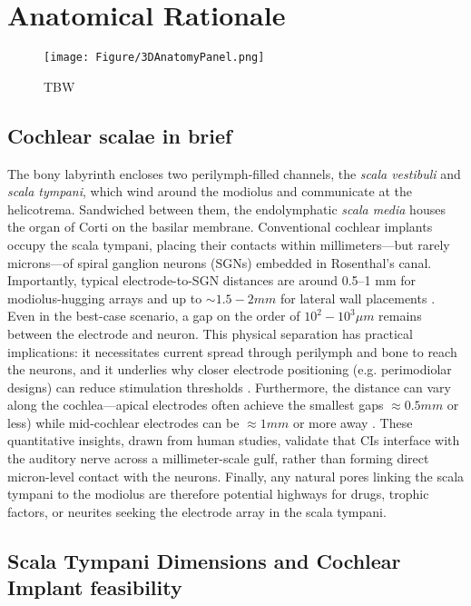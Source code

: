 
\section{\label{sec:AnatRationale}Anatomical Rationale}


\begin{figure}[ht]
  \centering
  \texttt{[image: Figure/3DAnatomyPanel.png]}
  \caption{TBW}
  \label{fig:cochlea_overview}
\end{figure}
\subsection{Cochlear scalae in brief}  
The bony labyrinth encloses two perilymph‑filled channels, the \emph{scala vestibuli} and \emph{scala tympani}, which wind around the modiolus and communicate at the helicotrema. Sandwiched between them, the endolymphatic \emph{scala media} houses the organ of Corti on the basilar membrane.  Conventional cochlear implants occupy the scala tympani, placing their contacts within millimeters---but rarely microns---of spiral ganglion neurons (SGNs) embedded in Rosenthal’s canal. Importantly, typical electrode-to-SGN distances are around 0.5–1 mm for modiolus-hugging arrays and up to $\sim1.5-2 mm$ for lateral wall placements \cite{Davis2016}. Even in the best-case scenario, a gap on the order of $10^{2}-10^{3} \mu m$ remains between the electrode and neuron. This physical separation has practical implications: it necessitates current spread through perilymph and bone to reach the neurons, and it underlies why closer electrode positioning (e.g. perimodiolar designs) can reduce stimulation thresholds \cite{Kawano1998}. Furthermore, the distance can vary along the cochlea---apical electrodes often achieve the smallest gaps $\approx0.5 mm$ or less) while mid-cochlear electrodes can be $\approx1 mm$ or more away \cite{Long2014}. These quantitative insights, drawn from human studies, validate that CIs interface with the auditory nerve across a millimeter-scale gulf, rather than forming direct micron-level contact with the neurons. Finally, any natural pores linking the scala tympani to the modiolus are therefore potential highways for drugs, trophic factors, or neurites seeking the electrode array in the scala tympani.


\subsection{Scala Tympani Dimensions and Cochlear Implant feasibility}

